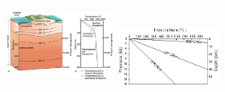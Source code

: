 \documentclass[10pt,compress]{beamer}
\begin{document}
\begin{frame}
\begin{columns}
\begin{column}[c]{0.55\linewidth}
{        \hbox{\includegraphics[width=3.5cm,clip]{./Pics/geothermalgradient.jpg}
              \includegraphics[width=3.3cm,clip]{./Pics/geotherms.png}}
     }
   \end{column}  
  \end{columns}
\end{frame}
\end{document}
